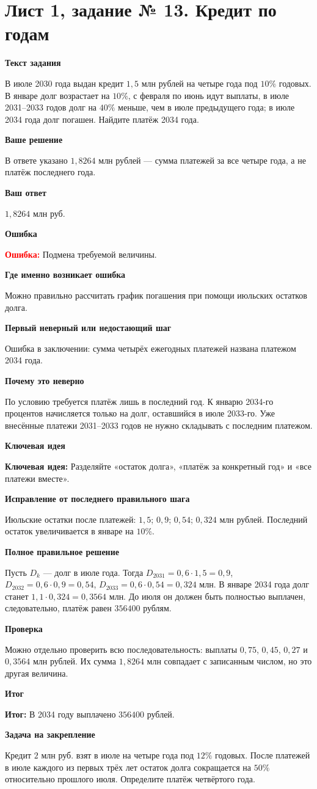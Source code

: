 \documentclass[11pt,a4paper]{article}
\newcommand{\Idea}{\textcolor{blue!60!black}{\textbf{Ключевая идея:}}}
\newcommand{\Res}{\textcolor{teal!60!black}{\textbf{Итог:}}}
\newcommand{\Heading}[2]{\par\medskip\textbf{#1}\par#2\par}
\begin{document}
\section*{Лист 1, задание № 13. Кредит по годам}
\Heading{Текст задания}{В июле 2030 года выдан кредит $1{,}5$ млн рублей на четыре года под $10\%$ годовых. В январе долг возрастает на $10\%$, с февраля по июнь идут выплаты, в июле 2031--2033 годов долг на $40\%$ меньше, чем в июле предыдущего года; в июле 2034 года долг погашен. Найдите платёж 2034 года.}
\Heading{Ваше решение}{В ответе указано $1{,}8264$ млн рублей --- сумма платежей за все четыре года, а не платёж последнего года.}
\Heading{Ваш ответ}{$1{,}8264$ млн руб.}
\Heading{Ошибка}{\textcolor{red}{\textbf{Ошибка:}} Подмена требуемой величины.}
\Heading{Где именно возникает ошибка}{Можно правильно рассчитать график погашения при помощи июльских остатков долга.}
\Heading{Первый неверный или недостающий шаг}{Ошибка в заключении: сумма четырёх ежегодных платежей названа платежом 2034 года.}
\Heading{Почему это неверно}{По условию требуется платёж лишь в последний год. К январю 2034-го процентов начисляется только на долг, оставшийся в июле 2033-го. Уже внесённые платежи 2031--2033 годов не нужно складывать с последним платежом.}
\Heading{Ключевая идея}{\Idea{} Разделяйте «остаток долга», «платёж за конкретный год» и «все платежи вместе».}
\Heading{Исправление от последнего правильного шага}{Июльские остатки после платежей: $1{,}5$; $0{,}9$; $0{,}54$; $0{,}324$ млн рублей. Последний остаток увеличивается в январе на $10\%$.}
\Heading{Полное правильное решение}{Пусть $D_k$ --- долг в июле года. Тогда $D_{2031}=0{,}6\cdot1{,}5=0{,}9$, $D_{2032}=0{,}6\cdot0{,}9=0{,}54$, $D_{2033}=0{,}6\cdot0{,}54=0{,}324$ млн. В январе 2034 года долг станет $1{,}1\cdot0{,}324=0{,}3564$ млн. До июля он должен быть полностью выплачен, следовательно, платёж равен $356400$ рублям.}
\Heading{Проверка}{Можно отдельно проверить всю последовательность: выплаты $0{,}75$, $0{,}45$, $0{,}27$ и $0{,}3564$ млн рублей. Их сумма $1{,}8264$ млн совпадает с записанным числом, но это другая величина.}
\Heading{Итог}{\Res{} В 2034 году выплачено $356400$ рублей.}
\Heading{Задача на закрепление}{Кредит $2$ млн руб. взят в июле на четыре года под $12\%$ годовых. После платежей в июле каждого из первых трёх лет остаток долга сокращается на $50\%$ относительно прошлого июля. Определите платёж четвёртого года.}
\newpage
{}\label{task:1_14}
\end{document}

